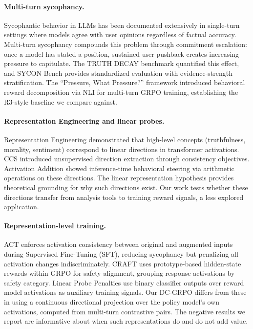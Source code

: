 \documentclass[11pt,a4paper]{article}
\begin{document}
\paragraph{Multi-turn sycophancy.}
Sycophantic behavior in LLMs has been documented extensively in single-turn settings where models agree with user opinions regardless of factual accuracy. Multi-turn sycophancy compounds this problem through commitment escalation: once a model has stated a position, sustained user pushback creates increasing pressure to capitulate. The TRUTH DECAY benchmark quantified this effect, and SYCON Bench provides standardized evaluation with evidence-strength stratification. The ``Pressure, What Pressure?'' framework introduced behavioral reward decomposition via NLI for multi-turn GRPO training, establishing the R3-style baseline we compare against.

\paragraph{Representation Engineering and linear probes.}
Representation Engineering demonstrated that high-level concepts (truthfulness, morality, sentiment) correspond to linear directions in transformer activations. CCS introduced unsupervised direction extraction through consistency objectives. Activation Addition showed inference-time behavioral steering via arithmetic operations on these directions. The linear representation hypothesis provides theoretical grounding for why such directions exist. Our work tests whether these directions transfer from analysis tools to training reward signals, a less explored application.

\paragraph{Representation-level training.}
ACT enforces activation consistency between original and augmented inputs during Supervised Fine-Tuning (SFT), reducing sycophancy but penalizing all activation changes indiscriminately. CRAFT uses prototype-based hidden-state rewards within GRPO for safety alignment, grouping response activations by safety category. Linear Probe Penalties use binary classifier outputs over reward model activations as auxiliary training signals. Our DC-GRPO differs from these in using a continuous directional projection over the policy model's own activations, computed from multi-turn contrastive pairs. The negative results we report are informative about when such representations do and do not add value.
\end{document}
